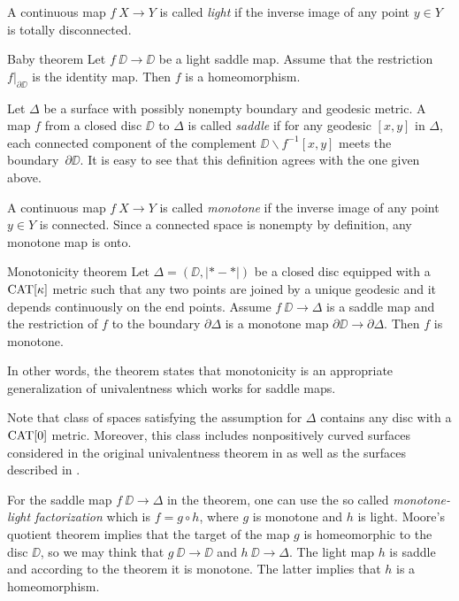 \documentclass{article}
\begin{document}
A continuous map $f\:X\to Y$ is called \emph{light} if the inverse image of any point $y\in Y$ is totally disconnected.

\begin{thm}{Baby theorem}\label{baby}
Let $f\:\DD\to \DD$ be a light saddle map.
Assume that 
the restriction $f|_{\partial\DD}$ is the identity map.
Then $f$ is a homeomorphism.
\end{thm}

Let $\Delta$ be a surface with possibly nonempty boundary and geodesic metric.
A map $f$ from a closed disc $\DD$ to $\Delta$ is called \emph{saddle} 
if for any geodesic $[x,y]$ in $\Delta$, each connected component of the complement $\DD\backslash f^{-1}[x,y]$ meets the boundary~$\partial\DD$.
It is easy to see that this definition agrees with the one given above.

A continuous map $f\:X\to Y$ is called \emph{monotone} if the inverse image of any point $y\in Y$ is connected.
Since a connected space is nonempty by definition, any monotone map is onto.

\begin{thm}{Monotonicity theorem}\label{thm:main}
Let $\Delta=(\DD,|{*}-{*}|)$ be a closed disc equipped with a $\mathop{\rm CAT}\nolimits[\kappa]$ metric 
such that any two points are joined by a unique geodesic and it depends continuously on the end points.
Assume $f\:\DD\to \Delta$ is a saddle map and the restriction of $f$ to the boundary $\partial\Delta$ is a monotone map 
$\partial\DD\to\partial\Delta$.
Then $f$ is monotone. 
\end{thm}

In other words, the theorem states that monotonicity is an appropriate generalization of univalentness which works for saddle maps.

Note that class of spaces satisfying the assumption for $\Delta$ contains any disc with a $\mathop{\rm CAT}\nolimits[0]$ metric.
Moreover, this class includes nonpositively curved surfaces considered in the original univalentness theorem in \cite{schoen-yau}
as well as the surfaces described in \cite{jost}.

For the saddle map $f\:\DD\to \Delta$ in the theorem,
one can use the so called \emph{monotone-light factorization} \cite{eilenberg}
which is $f=g\circ h$,
where $g$ is monotone and $h$ is light.
Moore's quotient theorem \cite{moore} implies that the target of the map $g$ is homeomorphic to the disc $\DD$, so we may think that $g\:\DD\to \DD$ and $h\:\DD\to \Delta$.
The light map $h$ is saddle and according to the theorem it is monotone.
The latter implies that $h$ is a homeomorphism.
\end{document}
